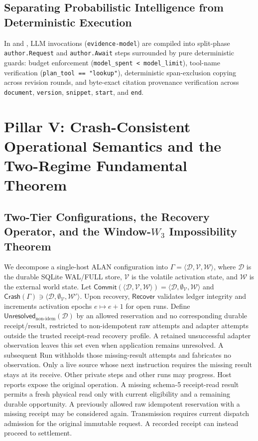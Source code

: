 \documentclass[11pt,a4paper]{article}
\theoremstyle{definition}
\theoremstyle{remark}
\begin{document}
\subsection{Separating Probabilistic Intelligence from Deterministic Execution}
In  and , LLM invocations (\texttt{evidence-model}) are compiled into split-phase \texttt{author.Request} and \texttt{author.Await} steps surrounded by pure deterministic guards: budget enforcement (\texttt{model\_spent < model\_limit}), tool-name verification (\texttt{plan\_tool == "lookup"}), deterministic span-exclusion copying across revision rounds, and byte-exact citation provenance verification across \texttt{document}, \texttt{version}, \texttt{snippet}, \texttt{start}, and \texttt{end}.

\section{Pillar V: Crash-Consistent Operational Semantics and the Two-Regime Fundamental Theorem}

\subsection{Two-Tier Configurations, the Recovery Operator, and the Window-\texorpdfstring{$W_3$}{W3} Impossibility Theorem}
We decompose a single-host ALAN configuration into $\Gamma = \langle \mathcal{D}, \mathcal{V}, \mathcal{W} \rangle$, where $\mathcal{D}$ is the durable SQLite WAL/FULL store, $\mathcal{V}$ is the volatile activation state, and $\mathcal{W}$ is the external world state. Let $\mathsf{Commit}(\langle \mathcal{D}, \mathcal{V}, \mathcal{W} \rangle) = \langle \mathcal{D}, \emptyset_{\mathcal{V}}, \mathcal{W} \rangle$ and $\mathsf{Crash}(\Gamma) \ni \langle \mathcal{D}, \emptyset_{\mathcal{V}}, \mathcal{W}' \rangle$. Upon recovery, $\mathsf{Recover}$ validates ledger integrity and increments activation epochs $e \mapsto e+1$ for open runs. Define $\mathsf{Unresolved}_{\text{non-idem}}(\mathcal D)$ by an allowed reservation and no corresponding durable receipt/result, restricted to non-idempotent raw attempts and adapter attempts outside the trusted receipt-read recovery profile. A retained unsuccessful adapter observation leaves this set even when application remains unresolved. A subsequent Run withholds those missing-result attempts and fabricates no observation. Only a live source whose next instruction requires the missing result stays at its receive. Other private steps and other runs may progress. Host reports expose the original operation. A missing schema-5 receipt-read result permits a fresh physical read only with current eligibility and a remaining durable opportunity. A previously allowed raw idempotent reservation with a missing receipt may be considered again. Transmission requires current dispatch admission for the original immutable request. A recorded receipt can instead proceed to settlement.
\end{document}
